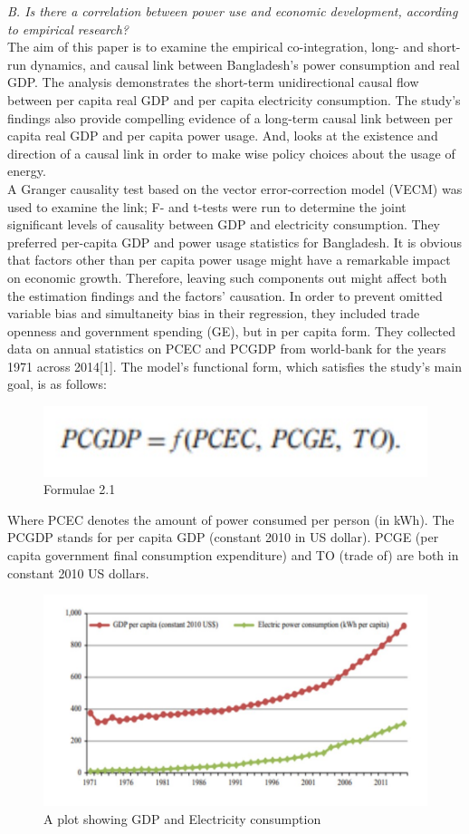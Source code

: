\documentclass[conference]{IEEEtran}
\begin{document}
\emph{B. Is there a correlation between power use and economic development, according to empirical research?}
\\The aim of this paper is to examine the empirical co-integration, long- and short-run dynamics, and causal link between Bangladesh's power consumption and real GDP. The analysis demonstrates the short-term unidirectional causal flow between per capita real GDP and per capita electricity consumption. The study's findings also provide compelling evidence of a long-term causal link between per capita real GDP and per capita power usage. And, looks at the existence and direction of a causal link in order to make wise policy choices about the usage of energy. \\
A Granger causality test based on the vector error-correction model (VECM) was used to examine the link; F- and t-tests were run to determine the joint significant levels of causality between GDP and electricity consumption. They preferred per-capita GDP and power usage statistics for Bangladesh. It is obvious that factors other than per capita power usage might have a remarkable impact on economic growth. Therefore, leaving such components out might affect both the estimation findings and the factors' causation. In order to prevent omitted variable bias and simultaneity bias in their regression, they included trade openness and government spending (GE), but in per capita form. They collected data on annual statistics on PCEC and PCGDP from world-bank for the years 1971 across 2014[1]. The model's functional form, which satisfies the study's main goal, is as follows:\\
\begin{figure}[htbp]
    \centerline{\includegraphics[scale=0.6]{electricity1.jpg}}
    \caption{Formulae 2.1}
\end{figure}
Where PCEC denotes the amount of power consumed per person (in kWh). The PCGDP stands for per capita GDP (constant 2010 in US dollar). PCGE (per capita government final consumption expenditure) and TO (trade of) are both in constant 2010 US dollars. \\
\begin{figure}[htbp]
    \centerline{\includegraphics[scale=0.6]{electricity2.jpg}}
    \caption{A plot showing GDP and Electricity consumption}
\end{figure}
\end{document}
